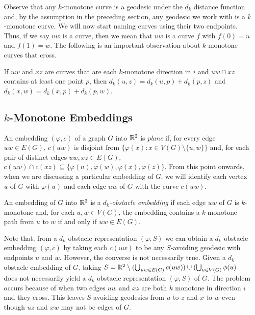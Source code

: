 \documentclass{patmorin}
\begin{document}
Observe that any $k$-monotone curve is a geodesic under the $d_k$
distance function and, by the assumption in the preceding section,
any geodesic we work with is a $k$-monotone curve.
We will now start naming curves using their two endpoints.  Thus,
if we say $uw$ is a curve, then we mean that $uw$ is a curve $f$ with
$f(0)=u$ and $f(1)=w$.  The following is an important observation about
$k$-monotone curves that cross.

\begin{obs}
   If $uw$ and $xz$ are curves that are each $k$-monotone direction in $i$
   and $uw\cap xz$ contains at least one point $p$, then $d_k(u,z) =
   d_k(u,p)+d_k(p,z)$ and $d_k(x,w)=d_k(x,p)+d_k(p,w)$.
\end{obs}

\subsection{$k$-Monotone Embeddings}

An embedding $(\varphi,c)$ of a graph $G$ into $\mathbb{R}^2$
is \emph{plane} if, for every edge $uw\in E(G)$, $c(uw)$
is disjoint from $\{\varphi(x) : x\in V(G)\setminus\{u,w\}\}$
and, for each pair of distinct edges $uw,xz\in E(G)$, $c(uw)\cap
c(xz)\subseteq\{\varphi(u),\varphi(w),\varphi(x),\varphi(z)\}$. 
From this point onwards, when we are discussing a particular embedding
of $G$, we will identify each vertex $u$ of $G$ with $\varphi(u)$ and
each edge $uw$ of $G$ with the curve $c(uw)$.

\begin{defn}
An embedding of $G$ into $\mathbb{R}^2$ is a \emph{$d_k$-obstacle embedding}
if each edge $uw$ of $G$ is $k$-monotone and, for each $u,w\in V(G)$,
the embedding contains a $k$-monotone path from $u$ to $w$ if and only
if $uw\in E(G)$.
\end{defn}

Note that, from a $d_k$ obstacle representation $(\varphi, S)$ we
can obtain a $d_k$ obstacle embedding $(\varphi, c)$ by taking each
$c(uw)$ to be any $S$-avoiding geodesic with endpoints $u$ and $w$.
However, the converse is not necessarily true.  Given a $d_k$ obstacle
embedding of $G$, taking $S=\mathbb{R}^2\setminus (\bigcup_{uw\in E(G)}c(uw))\cup
(\bigcup_{u\in V(G)} \phi(u)$ does not necessarily yield a $d_k$ obstacle
representation $(\varphi,S)$ of $G$.  The problem occurs because of
 when two edges $uw$ and $xz$ are both $k$ monotone in
direction $i$ and they cross. This leaves $S$-avoiding geodesics from $u$
to $z$ and $x$ to $w$ even though $uz$ and $xw$ may not be edges of $G$.
\end{document}
